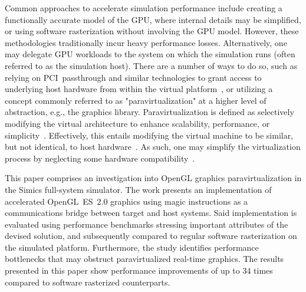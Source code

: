 Common approaches to accelerate simulation performance include creating a functionally accurate model of the GPU, where internal details may be simplified, or using software rasterization without involving the GPU model.
However, these methodologies traditionally incur heavy performance losses.
Alternatively, one may delegate GPU workloads to the system on which the simulation runs (often referred to as the simulation host).
There are a number of ways to do so, such as relying on PCI~passthrough and similar technologies to grant access to underlying host hardware from within the virtual platform~, or utilizing a concept commonly referred to as "paravirtualization" at a higher level of abstraction, e.g., the graphics library.
Paravirtualization is defined as selectively modifying the virtual architecture to enhance scalability, performance, or simplicity~.
Effectively, this entails modifying the virtual machine to be similar, but not identical, to host hardware~.
As such, one may simplify the virtualization process by neglecting some hardware compatibility~.

This paper comprises an investigation into OpenGL graphics paravirtualization in the Simics full-system simulator.
The work presents an implementation of accelerated OpenGL~ES~$2.0$ graphics using magic instructions as a communications bridge between target and host systems.
Said implementation is evaluated using performance benchmarks stressing important attributes of the devised solution, and subsequently compared to regular software rasterization on the simulated platform.
Furthermore, the study identifies performance bottlenecks that may obstruct paravirtualized real-time graphics.
The results presented in this paper show performance improvements of up to $34$ times compared to software rasterized counterparts.
